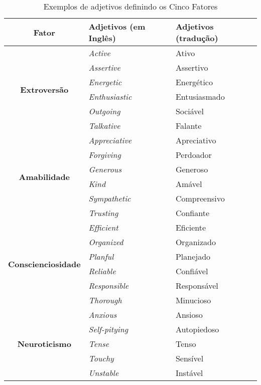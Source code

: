 \begin{table*}[ht]
\footnotesize
\caption{\small Exemplos de adjetivos definindo os Cinco Fatores} 
\addtolength{\tabcolsep}{-3.5pt}
\renewcommand{\arraystretch}{1.4} 
\centering
	
		    \begin{tabular}{|c|l|l|}
    \hline %
    \textbf{Fator} & \textbf{Adjetivos (em Inglês)} & \textbf{Adjetivos (tradução)} \\
    \hline %
    \multirow{6}[2]{*}{\textbf{Extroversão}} & \textit{Active} & Ativo \\
          & \textit{Assertive} & Assertivo \\
          & \textit{Energetic} & Energético \\
          & \textit{Enthusiastic} & Entusiasmado \\
          & \textit{Outgoing} & Sociável \\
          & \textit{Talkative} & Falante \\ \hline
    \multirow{6}[2]{*}{\textbf{Amabilidade}} & \textit{Appreciative} & Apreciativo \\
          & \textit{Forgiving} & Perdoador \\
          & \textit{Generous} & Generoso \\
          & \textit{Kind}  & Amável \\
          & \textit{Sympathetic} & Compreensivo \\
          & \textit{Trusting} & Confiante \\ \hline
		\multirow{6}[1]{*}{\textbf{Conscienciosidade}} & \textit{Efficient} & Eficiente \\
          & \textit{Organized} & Organizado \\
          & \textit{Planful} & Planejado \\
          & \textit{Reliable} & Confiável \\
          & \textit{Responsible} & Responsável \\
          & \textit{Thorough} & Minucioso \\ \hline
    \multirow{6}[0]{*}{\textbf{Neuroticismo}} & \textit{Anxious} & Ansioso \\
          & \textit{Self-pitying} & Autopiedoso \\
          & \textit{Tense} & Tenso \\
          & \textit{Touchy} & Sensível \\
          & \textit{Unstable} & Instável \\

\end{tabular}
\end{table*}
